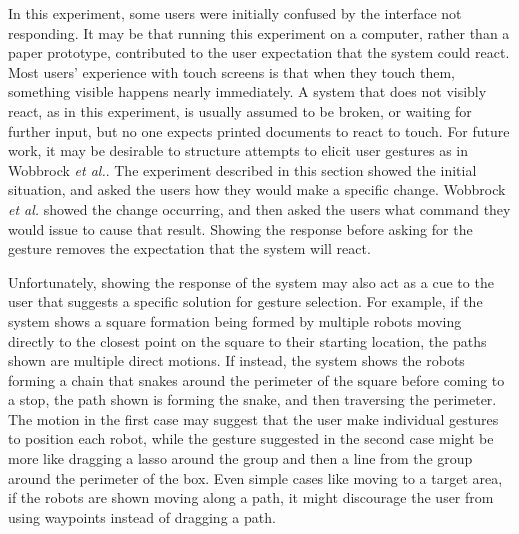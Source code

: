 In this experiment, some users were initially confused by the interface not responding. 
It may be that running this experiment on a computer, rather than a paper prototype, contributed to the user expectation that the system could react. 
Most users' experience with touch screens is that when they touch them, something visible happens nearly immediately. 
A system that does not visibly react, as in this experiment, is usually assumed to be broken, or waiting for further input, but no one expects printed documents to react to touch.
For future work, it may be desirable to structure attempts to elicit user gestures as in Wobbrock \emph{et al.}. 
The experiment described in this section showed the initial situation, and asked the users how they would make a specific change. 
Wobbrock \emph{et al.} showed the change occurring, and then asked the users what command they would issue to cause that result. 
Showing the response before asking for the gesture removes the expectation that the system will react. 

Unfortunately, showing the response of the system may also act as a cue to the user that suggests a specific solution for gesture selection. 
For example, if the system shows a square formation being formed by multiple robots moving directly to the closest point on the square to their starting location, the paths shown are multiple direct motions. 
If instead, the system shows the robots forming a chain that snakes around the perimeter of the square before coming to a stop, the path shown is forming the snake, and then traversing the perimeter. 
The motion in the first case may suggest that the user make individual gestures to position each robot, while the gesture suggested in the second case might be more like dragging a lasso around the group and then a line from the group around the perimeter of the box. 
Even simple cases like moving to a target area, if the robots are shown moving along a path, it might discourage the user from using waypoints instead of dragging a path.